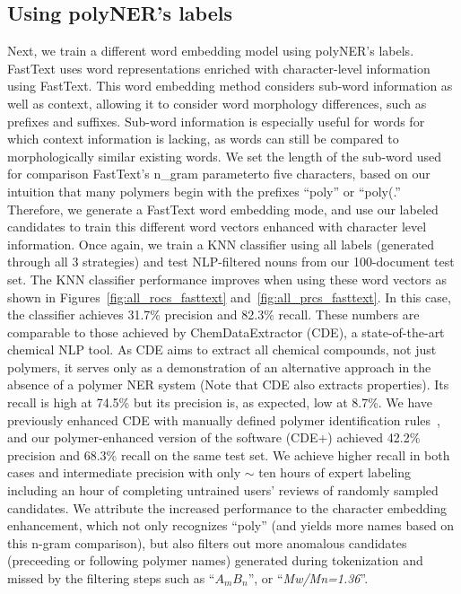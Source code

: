 \subsection{Using polyNER's labels}
Next, we train a different word embedding model using polyNER's labels.
FastText uses word representations enriched with character-level information using FastText.
This word embedding method considers sub-word information as well as
context, allowing it to consider word morphology differences, such as prefixes
and suffixes. Sub-word information is especially useful for words for which
context information is lacking, as words can still be compared to morphologically similar
existing words. We set the length of the sub-word used for comparison\textemdash
FastText's n_gram parameter\textemdash to five characters, based on our intuition that
many polymers begin with the prefixes ``poly'' or ``poly(.'' \\

Therefore, we generate a FastText word embedding mode, and use our labeled candidates to train this different word vectors enhanced with character level information.
Once again, we train a KNN classifier using all labels (generated through all 3 strategies)
 and test NLP-filtered nouns from our 100-document test set.
The KNN classifier performance improves when using these word vectors as shown in Figures~\ref{fig:all_rocs_fasttext} and~\ref{fig:all_prcs_fasttext}.
In this case, the classifier achieves 31.7\% precision and 82.3\% recall. 
These numbers are comparable to those achieved by ChemDataExtractor (CDE), a state-of-the-art chemical NLP tool.
As CDE aims to extract all
chemical compounds, not just polymers, it serves only as a demonstration of an
alternative approach in the absence of a polymer NER system (Note that CDE also extracts properties). 
Its recall is high
at 74.5\% but its precision is, as expected, low at 8.7\%. 
We have previously enhanced CDE with
manually defined polymer identification rules~\cite{tchoua2017towards},
and our polymer-enhanced version of the software (CDE+) achieved 42.2\% precision and 68.3\% recall on the same test set. 
We achieve higher recall in both cases and intermediate precision with only $\sim$ ten hours of expert labeling including an hour of completing untrained users' reviews of randomly sampled candidates.
We attribute the increased performance to the character embedding enhancement, which not only recognizes ``poly'' (and yields more names based on this n-gram comparison), but also filters out more anomalous candidates (preceeding or following polymer names) generated during tokenization and missed by the filtering steps such as ``\textit{$A_mB_n$}'', or ``\textit{Mw/Mn=1.36}''.  

